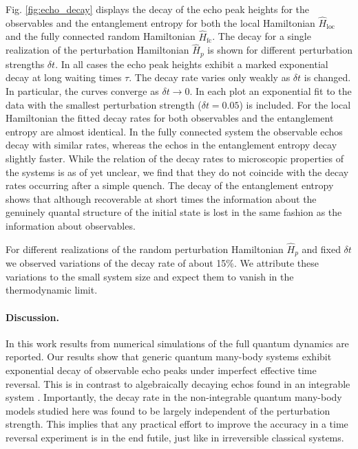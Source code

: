 \documentclass[%
 reprint,
unsortedaddress,
 amsmath,amssymb,
 prl,
]{revtex4-1}
\begin{document}
Fig. \ref{fig:echo_decay} displays the decay of the echo peak heights for the observables and the 
entanglement entropy for both the local Hamiltonian $\hat H_\text{loc}$ and the fully connected random 
Hamiltonian $\hat H_\text{fc}$. The decay for a single realization of the perturbation Hamiltonian $\hat H_p$ 
is shown for different perturbation strengths $\delta t$. In all cases the echo peak heights exhibit a
marked exponential decay at long waiting times $\tau$. The decay rate 
varies only weakly as $\delta t$ is changed. In particular, the curves converge as $\delta t\to0$.
In each plot an exponential fit to the data with the smallest perturbation strength ($\delta t=0.05$) is
included. For the local Hamiltonian the fitted decay rates for both observables and the entanglement
entropy are almost identical. In the fully connected system the observable echos decay with similar rates,
whereas the echos in the entanglement entropy decay slightly faster. 
While the relation of the decay rates to microscopic properties of the systems is as of yet unclear, 
we find that they
do not coincide with the decay rates occurring after a simple quench.
The decay of the entanglement
entropy shows that although recoverable at short times the information about the genuinely quantal 
structure of the initial state is lost in the same fashion as the information about observables.

For different realizations of the random perturbation Hamiltonian $\hat H_p$ and fixed $\delta t$ 
we observed variations of the decay rate of about 15\%. We attribute these variations to the small
system size and expect them to vanish in the thermodynamic limit.


\paragraph{Discussion.}
In this work results from numerical simulations of the full quantum dynamics are reported. 
Our results show that generic quantum many-body systems exhibit exponential decay of 
observable echo peaks under imperfect effective time reversal. This is in contrast to algebraically 
decaying echos found in an integrable system \cite{Schmitt2016}. 
Importantly, the decay rate in the non-integrable
quantum many-body models studied here was found to be largely independent of the perturbation 
strength. This implies that any practical effort to improve the accuracy in a time reversal experiment 
is in the end futile, just like in irreversible classical systems.  
\end{document}
